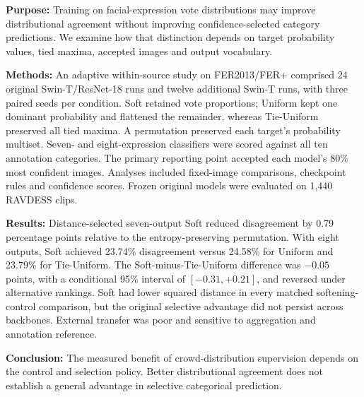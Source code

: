 \noindent\textbf{Purpose:} Training on facial-expression vote distributions may improve distributional agreement without improving confidence-selected category predictions. We examine how that distinction depends on target probability values, tied maxima, accepted images and output vocabulary.
\par\smallskip
\noindent\textbf{Methods:} An adaptive within-source study on FER2013/FER+ comprised 24 original Swin-T/ResNet-18 runs and twelve additional Swin-T runs, with three paired seeds per condition. Soft retained vote proportions; Uniform kept one dominant probability and flattened the remainder, whereas Tie-Uniform preserved all tied maxima. A permutation preserved each target's probability multiset. Seven- and eight-expression classifiers were scored against all ten annotation categories. The primary reporting point accepted each model's 80\% most confident images. Analyses included fixed-image comparisons, checkpoint rules and confidence scores. Frozen original models were evaluated on 1,440 RAVDESS clips.
\par\smallskip
\noindent\textbf{Results:} Distance-selected seven-output Soft reduced disagreement by 0.79 percentage points relative to the entropy-preserving permutation. With eight outputs, Soft achieved 23.74\% disagreement versus 24.58\% for Uniform and 23.79\% for Tie-Uniform. The Soft-minus-Tie-Uniform difference was $-0.05$ points, with a conditional 95\% interval of $[-0.31,+0.21]$, and reversed under alternative rankings. Soft had lower squared distance in every matched softening-control comparison, but the original selective advantage did not persist across backbones. External transfer was poor and sensitive to aggregation and annotation reference.
\par\smallskip
\noindent\textbf{Conclusion:} The measured benefit of crowd-distribution supervision depends on the control and selection policy. Better distributional agreement does not establish a general advantage in selective categorical prediction.

